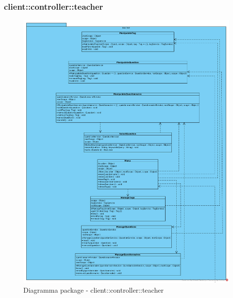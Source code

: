 \subsubsection{client::controller::teacher}
\begin{center}
		\begin{figure}[H]
			\centering \includegraphics[scale=4, max width=\textwidth, max height=\myheight]{../img/diagrammiClassi/client/controller/teacher.png}
			\caption{Diagramma package - client::controller::teacher}
		\end{figure}
	\end{center}\hypertarget{client::controller::teacher::ManipulateTag}{}
